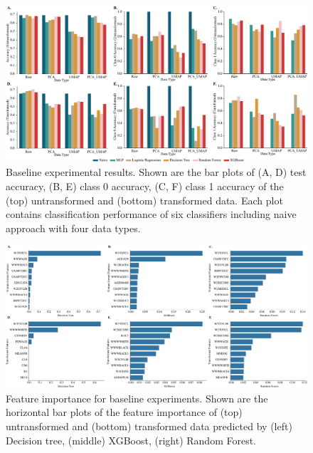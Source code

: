 \begin{figure}[t!]
    \centering
    \includegraphics[width=14cm]{Figures/Figure3.pdf}
    \caption{Baseline experimental results. Shown are the bar plots of (A, D) test accuracy, (B, E) class 0 accuracy, (C, F) class 1 accuracy of the (top) untransformed and (bottom) transformed data. Each plot contains classification performance of six classifiers including naive approach with four data types.}
    \label{fig:figure3}
\end{figure} 

\begin{figure}[t!]
    \centering
    \includegraphics[width=14cm]{Figures/Figure4.pdf}
    \caption{Feature importance for baseline experiments. Shown are the horizontal bar plots of the feature importance of (top) untransformed and (bottom) transformed data predicted by (left) Decision tree, (middle) XGBoost, (right) Random Forest.}
    \label{fig:figure4}
\end{figure} 

